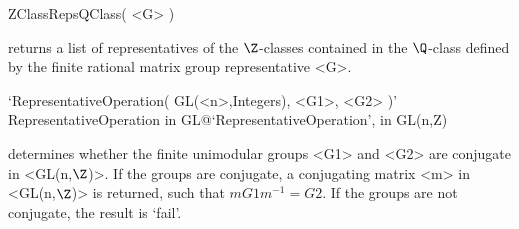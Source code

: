 \> ZClassRepsQClass( <G> )

returns a list of representatives of the $\Z$-classes contained in the
$\Q$-class defined by the finite rational matrix group representative <G>.

\> `RepresentativeOperation( GL(<n>,Integers), <G1>, <G2> )'%
{RepresentativeOperation in GL}@{`RepresentativeOperation', in GL(n,Z)}

determines whether the finite unimodular groups <G1> and <G2> are 
conjugate in <GL(n,$\Z$)>. If the groups are conjugate, a conjugating 
matrix <m> in <GL(n,$\Z$)> is returned, such that $m G1 m^{-1} = G2$. 
If the groups are not conjugate, the result is `fail'.


